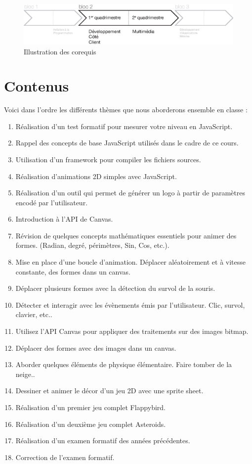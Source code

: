 \begin{figure}[H]
    \begin{center}
        \includegraphics[width=\textwidth]{figures/corequis.eps}
        \caption{Illustration des corequis}
        \label{Fig:GQM}
    \end{center}
\end{figure}
\clearpage

\section{Contenus}

Voici dans l'ordre les différents thèmes que nous aborderons ensemble en classe :
\begin{enumerate}
    \item Réalisation d'un test formatif pour mesurer votre niveau en JavaScript.
    \item Rappel des concepts de base JavaScript utilisés dans le cadre de ce cours.
    \item Utilisation d’un framework pour compiler les fichiers sources.
    \item Réalisation d'animations 2D simples avec JavaScript.
    \item Réalisation d’un outil qui permet de générer un logo à partir de paramètres encodé par l’utilisateur.
    \item Introduction à l’API de Canvas.
    \item Révision de quelques concepts mathématiques essentiels pour animer des formes. (Radian, degré, périmètres, Sin, Cos, etc.).
    \item Mise en place d’une boucle d’animation. Déplacer aléatoirement et à vitesse constante, des formes dans un canvas.
    \item Déplacer plusieurs formes avec la détection du survol de la souris.
    \item Détecter et interagir avec les évènements émis par l'utilisateur. Clic, survol, clavier, etc..
    \item Utilisez l’API Canvas pour appliquer des traitements sur des images bitmap.
    \item Déplacer des formes avec des images dans un canvas.
    \item Aborder quelques éléments de physique élémentaire. Faire tomber de la neige..
    \item Dessiner et animer le décor d’un jeu 2D avec une sprite sheet.
    \item Réalisation d’un premier jeu complet Flappybird.
    \item Réalisation d’un deuxième jeu complet Asteroids.
    \item Réalisation d’un examen formatif des années précédentes.
    \item Correction de l'examen formatif.
\end{enumerate}

